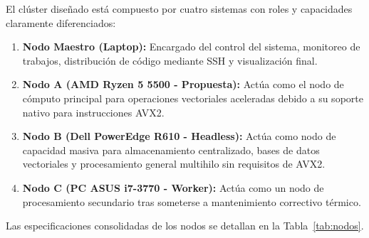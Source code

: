 \documentclass[11pt,a4paper]{article}
\begin{document}
El clúster diseñado está compuesto por cuatro sistemas con roles y capacidades claramente diferenciados:
\begin{enumerate}
    \item \textbf{Nodo Maestro (Laptop):} Encargado del control del sistema, monitoreo de trabajos, distribución de código mediante SSH y visualización final.
    \item \textbf{Nodo A (AMD Ryzen 5 5500 - Propuesta):} Actúa como el nodo de cómputo principal para operaciones vectoriales aceleradas debido a su soporte nativo para instrucciones AVX2.
    \item \textbf{Nodo B (Dell PowerEdge R610 - Headless):} Actúa como nodo de capacidad masiva para almacenamiento centralizado, bases de datos vectoriales y procesamiento general multihilo sin requisitos de AVX2.
    \item \textbf{Nodo C (PC ASUS i7-3770 - Worker):} Actúa como un nodo de procesamiento secundario tras someterse a mantenimiento correctivo térmico.
\end{enumerate}

Las especificaciones consolidadas de los nodos se detallan en la Tabla~\ref{tab:nodos}.

\begin{table}[h!]
\centering
\caption{Especificaciones Técnicas Consolidadas de los Nodos del Clúster}
\label{tab:nodos}
\vspace{0.2cm}
\end{table}
\end{document}
